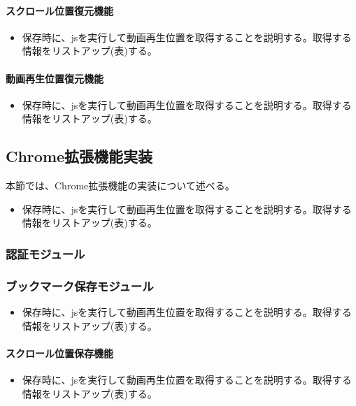 \paragraph{スクロール位置復元機能}
\begin{itemize}
  \item 保存時に、jsを実行して動画再生位置を取得することを説明する。取得する情報をリストアップ(表)する。
\end{itemize}

\paragraph{動画再生位置復元機能}
\begin{itemize}
  \item 保存時に、jsを実行して動画再生位置を取得することを説明する。取得する情報をリストアップ(表)する。
\end{itemize}

\subsection{Chrome拡張機能実装}
本節では、Chrome拡張機能の実装について述べる。
\begin{itemize}
  \item 保存時に、jsを実行して動画再生位置を取得することを説明する。取得する情報をリストアップ(表)する。
\end{itemize}

\subsubsection{認証モジュール}

\subsubsection{ブックマーク保存モジュール}
\begin{itemize}
  \item 保存時に、jsを実行して動画再生位置を取得することを説明する。取得する情報をリストアップ(表)する。
\end{itemize}

\paragraph{スクロール位置保存機能}
\begin{itemize}
  \item 保存時に、jsを実行して動画再生位置を取得することを説明する。取得する情報をリストアップ(表)する。
\end{itemize}


